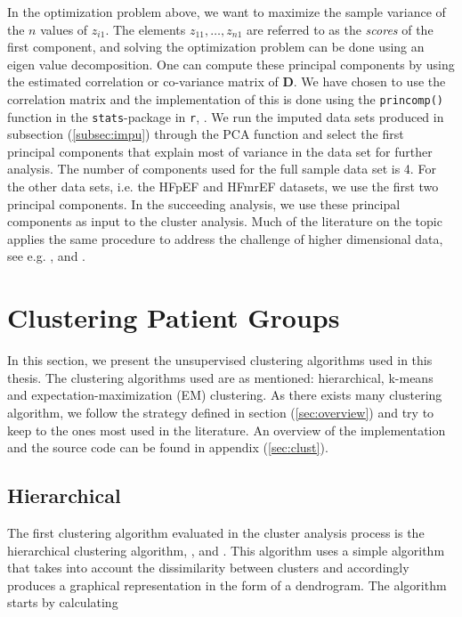 \documentclass[../thesis.tex]{subfiles}
\begin{document}
\noindent In the optimization problem above, we want to maximize the sample variance of the $n$ values of $z_{i1}$. The elements $z_{11}, \hdots ,z_{n1}$ are referred to as the \textit{scores} of the first component, and solving the optimization problem can be done using an eigen value decomposition. One can compute these principal components by using the estimated correlation or co-variance matrix of $\mathbf{D}$. We have chosen to use the correlation matrix and the implementation of this is done using the \texttt{princomp()} function in the \texttt{stats}-package in \texttt{r}, \citep{stats}. We run the imputed data sets produced in subsection (\ref{subsec:impu}) through the PCA function and select the first principal components that explain most of variance in the data set for further analysis. The number of components used for the full sample data set is 4. For the other data sets, i.e. the HFpEF and HFmrEF datasets, we use the first two principal components. In the succeeding analysis, we use these principal components as input to the cluster analysis. Much of the literature on the topic applies the same procedure to address the challenge of higher dimensional data, see e.g. \cite{shah2014phenomapping}, \cite{ahmad2014clinical} and \cite{katz2017phenomapping}. 

\section{Clustering Patient Groups}
\label{sec:cluster_pat_gro}

\noindent In this section, we present the unsupervised clustering algorithms used in this thesis. The clustering algorithms used are as mentioned: hierarchical, k-means and expectation-maximization (EM) clustering. As there exists many clustering algorithm, we follow the strategy defined in section (\ref{sec:overview}) and try to keep to the ones most used in the literature. An overview of the implementation and the source code can be found in appendix (\ref{sec:clust}).

\vspace*{-0,25cm}\subsection{Hierarchical}
\label{subsec:hierarchical}

\noindent The first clustering algorithm evaluated in the cluster analysis process is the hierarchical clustering algorithm, \cite{sibson1973slink}, \cite{defays1977efficient} and \citep{rohlf198212}. This algorithm uses a simple algorithm that takes into account the dissimilarity between clusters and accordingly produces a graphical representation in the form of a dendrogram. The algorithm starts by calculating\\
\end{document}
